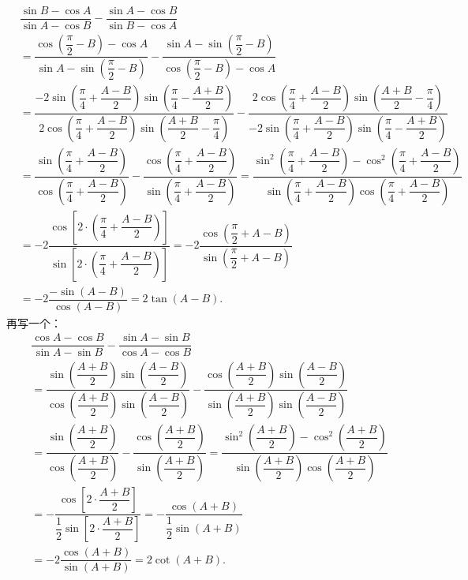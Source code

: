 \begin{align*}
&\dfrac{\sin B - \cos A}{\sin A - \cos B} - \dfrac{\sin A - \cos B}{\sin B - \cos A}\\[1.2ex]
&=\dfrac{\cos\left(\dfrac{\pi}{2} - B\right) - \cos A}{\sin A - \sin\left(\dfrac{\pi}{2} - B\right)} - \dfrac{\sin A - \sin\left(\dfrac{\pi}{2} - B\right)}{\cos\left(\dfrac{\pi}{2} - B\right) - \cos A}\\[1.2ex]
&=\dfrac{-2\sin\left(\dfrac{\pi}{4} + \dfrac{A - B}{2}\right)\sin\left(\dfrac{\pi}{4} - \dfrac{A + B}{2}\right)}{2\cos\left(\dfrac{\pi}{4} + \dfrac{A - B}{2}\right)\sin\left(\dfrac{A + B}{2} - \dfrac{\pi}{4}\right)} - \dfrac{2\cos\left(\dfrac{\pi}{4} + \dfrac{A - B}{2}\right)\sin\left(\dfrac{A + B}{2} - \dfrac{\pi}{4}\right)}{-2\sin\left(\dfrac{\pi}{4} + \dfrac{A - B}{2}\right)\sin\left(\dfrac{\pi}{4} - \dfrac{A + B}{2}\right)}\\[1.2ex]
&=\dfrac{\sin\left(\dfrac{\pi}{4} + \dfrac{A - B}{2}\right)}{\cos\left(\dfrac{\pi}{4} + \dfrac{A - B}{2}\right)} - \dfrac{\cos\left(\dfrac{\pi}{4} + \dfrac{A - B}{2}\right)}{\sin\left(\dfrac{\pi}{4} + \dfrac{A - B}{2}\right)} = \dfrac{\sin^2\left(\dfrac{\pi}{4} + \dfrac{A - B}{2}\right) - \cos^2\left(\dfrac{\pi}{4} + \dfrac{A - B}{2}\right)}{\sin\left(\dfrac{\pi}{4} + \dfrac{A - B}{2}\right)\cos\left(\dfrac{\pi}{4} + \dfrac{A - B}{2}\right)}\\[1.2ex]
&=-2\dfrac{\cos\left[2 \cdot \left(\dfrac{\pi}{4} + \dfrac{A - B}{2}\right)\right]}{\sin\left[2 \cdot \left(\dfrac{\pi}{4} + \dfrac{A - B}{2}\right)\right]} = -2\dfrac{\cos\left(\dfrac{\pi}{2} + A - B\right)}{\sin\left(\dfrac{\pi}{2} + A - B\right)}\\[1.2ex]
&=-2\dfrac{-\sin\left(A - B\right)}{\cos\left(A - B\right)} = 2\tan\left(A - B\right).
\end{align*}
再写一个：
\begin{align*}
&\dfrac{\cos A - \cos B}{\sin A - \sin B} - \dfrac{\sin A - \sin B}{\cos A - \cos B}\\[1.2ex]
&=\dfrac{\sin\left(\dfrac{A+B}{2}\right)\sin\left(\dfrac{A-B}{2}\right)}{\cos\left(\dfrac{A+B}{2}\right)\sin\left(\dfrac{A-B}{2}\right)} - \dfrac{\cos\left(\dfrac{A+B}{2}\right)\sin\left(\dfrac{A-B}{2}\right)}{\sin\left(\dfrac{A+B}{2}\right)\sin\left(\dfrac{A-B}{2}\right)}\\[1.2ex]
&=\dfrac{\sin\left(\dfrac{A+B}{2}\right)}{\cos\left(\dfrac{A+B}{2}\right)} - \dfrac{\cos\left(\dfrac{A+B}{2}\right)}{\sin\left(\dfrac{A+B}{2}\right)} = \dfrac{\sin^2\left(\dfrac{A+B}{2}\right) - \cos^2\left(\dfrac{A+B}{2}\right)}{\sin\left(\dfrac{A+B}{2}\right)\cos\left(\dfrac{A+B}{2}\right)}\\[1.2ex]
&=-\dfrac{\cos\left[2 \cdot \dfrac{A+B}{2}\right]}{\dfrac{1}{2}\sin\left[2 \cdot \dfrac{A+B}{2}\right]} = -\dfrac{\cos(A+B)}{\dfrac{1}{2}\sin(A+B)}\\[1.2ex]
&=-2\dfrac{\cos(A+B)}{\sin(A+B)} = 2\cot(A+B).
\end{align*}
